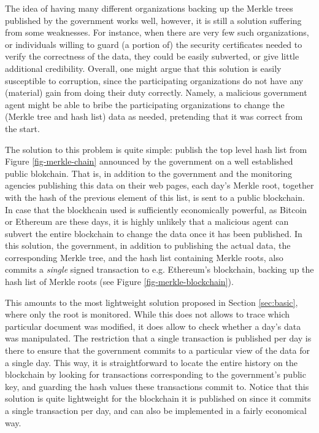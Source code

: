 

The idea of having many different organizations backing up the Merkle trees published by the government works well, however, it is still a solution suffering from some weaknesses. For instance, when there are very few such organizations, or individuals willing to guard (a portion of) the security certificates needed to verify the correctness of the data, they could be easily subverted, or give little additional credibility. Overall, one might argue that this solution is easily susceptible to corruption, since the participating organizations do not have any (material) gain from doing their duty correctly. Namely, a malicious government agent might be able to bribe the participating organizations to change the (Merkle tree and hash list) data as needed, pretending that it was correct from the start. %


The solution to this problem is quite simple: publish the top level hash list from Figure \ref{fig-merkle-chain} announced by the government on a well established public blokchain. That is, in addition to the government and the monitoring agencies publishing this data on their web pages, each day's Merkle root, together with the hash of the previous element of this list, is sent to a public blockchain. In case that the blockhcain used is sufficiently economically powerful, as Bitcoin or Ethereum are these days, it is highly unlikely that a malicious agent can subvert the entire blockchain to change the data once it has been published. In this solution, the government, in addition to publishing the actual data, the corresponding Merkle tree, and the hash list containing Merkle roots, also commits a {\em single} signed transaction to e.g. Ethereum's blockchain, backing up the hash list of Merkle roots (see Figure \ref{fig-merkle-blockchain}).

This amounts to the most lightweight solution proposed in Section \ref{sec:basic}, where only the root is monitored. While this does not allows to trace which particular document was modified, it does allow to check whether a day's data was manipulated. The restriction that a single transaction is published per day is there to ensure that  the government commits to a particular view of the data for a single day. This way, it is straightforward to locate the entire history on the blockchain by looking for transactions corresponding to the government's public key, and guarding the hash values these transactions commit to. Notice that this solution is quite lightweight for the blockchain it is published on since it commits a single transaction per day, and can also be implemented in a fairly economical way.


